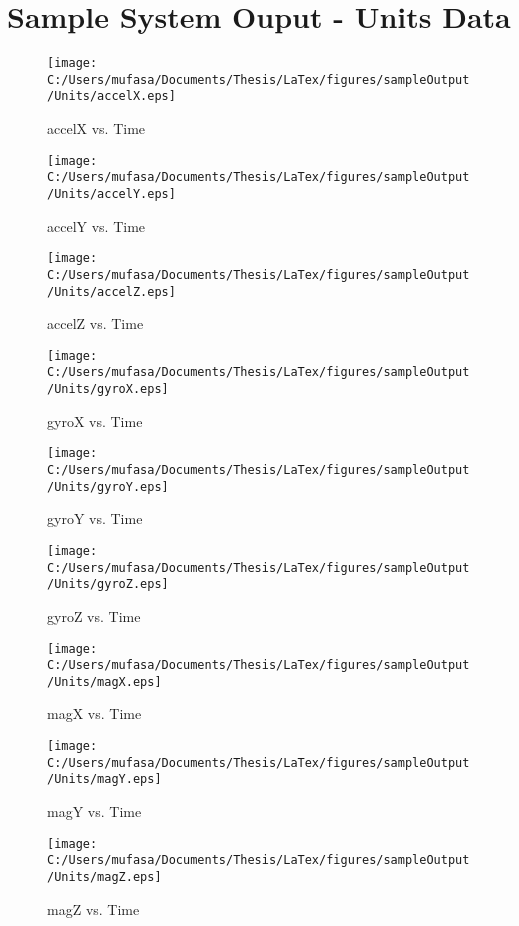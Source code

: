 \section{Sample System Ouput - Units Data}
\begin{figure}[]
	\centering
	\caption{accelX vs. Time}
		\texttt{[image: C:/Users/mufasa/Documents/Thesis/LaTex/figures/sampleOutput/Units/accelX.eps]}
\end{figure}
\begin{figure}[]
	\centering
	\caption{accelY vs. Time}
		\texttt{[image: C:/Users/mufasa/Documents/Thesis/LaTex/figures/sampleOutput/Units/accelY.eps]}
\end{figure}
\begin{figure}[]
	\centering
	\caption{accelZ vs. Time}
		\texttt{[image: C:/Users/mufasa/Documents/Thesis/LaTex/figures/sampleOutput/Units/accelZ.eps]}
\end{figure}
\begin{figure}[]
	\centering
	\caption{gyroX vs. Time}
		\texttt{[image: C:/Users/mufasa/Documents/Thesis/LaTex/figures/sampleOutput/Units/gyroX.eps]}
\end{figure}
\begin{figure}[]
	\centering
	\caption{gyroY vs. Time}
		\texttt{[image: C:/Users/mufasa/Documents/Thesis/LaTex/figures/sampleOutput/Units/gyroY.eps]}
\end{figure}
\begin{figure}[]
	\centering
	\caption{gyroZ vs. Time}
		\texttt{[image: C:/Users/mufasa/Documents/Thesis/LaTex/figures/sampleOutput/Units/gyroZ.eps]}
\end{figure}
\clearpage
\begin{figure}[]
	\centering
	\caption{magX vs. Time}
		\texttt{[image: C:/Users/mufasa/Documents/Thesis/LaTex/figures/sampleOutput/Units/magX.eps]}
\end{figure}
\begin{figure}[]
	\centering
	\caption{magY vs. Time}
		\texttt{[image: C:/Users/mufasa/Documents/Thesis/LaTex/figures/sampleOutput/Units/magY.eps]}
\end{figure}
\begin{figure}[]
	\centering
	\caption{magZ vs. Time}
		\texttt{[image: C:/Users/mufasa/Documents/Thesis/LaTex/figures/sampleOutput/Units/magZ.eps]}
\end{figure}
